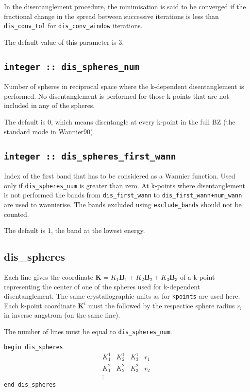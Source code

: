 In the disentanglement procedure, the minimisation is said to be converged
if the fractional change in the spread between successive
iterations is less than
\verb#dis_conv_tol# for \verb#dis_conv_window# iterations.

The default value of this parameter is 3.

\subsection[dis\_spheres\_num]{\tt integer :: dis\_spheres\_num}
Number of spheres in reciprocal space where the k-dependent
disentanglement is performed. No disentanglement is performed for 
those k-points that are not included in any of the spheres.

The default is 0, which means disentangle at every k-point in the full BZ (the standard mode in Wannier90).


\subsection[dis\_spheres\_first\_wann]{\tt integer :: dis\_spheres\_first\_wann}
Index of the first band that has to be considered as a Wannier function. Used only if {\tt dis\_spheres\_num} is greater than zero.
At k-points where disentanglement is not performed the bands from
{\tt dis\_first\_wann} to {\tt dis\_first\_wann+num\_wann} are used
to wannierise. The bands excluded using {\tt exclude\_bands} should not
be counted.

The default is 1, the band at the lowest energy.


\subsection[dis\_spheres]{dis\_spheres}
Each line gives the coordinate $\mathbf{K}=K_1 \mathbf{B}_{1} + K_2
\mathbf{B}_{2} + K_3 \mathbf{B}_3$ of a k-point representing the
center of one of the spheres used for k-dependent disentanglement.
The same crystallographic units as for {\tt kpoints} are used here.
Each k-point coordinate $\mathbf{K}^i$ must the followed by the 
respectice sphere radius $r_{i}$ in inverse angstrom (on the same line).

The number of lines must be equal to {\tt dis\_spheres\_num}.

\noindent  \verb#begin dis_spheres#
$$
\begin{array}{cccc}
 K^{1}_{1} & K^{1}_{2} & K^{1}_{3} & r_{1} \\
 K^{2}_{1} & K^{2}_{2} & K^{2}_{3} & r_{2} \\
\vdots
\end{array}
$$
\verb#end dis_spheres#

